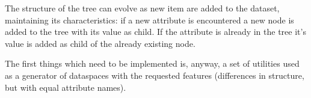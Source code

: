 \documentclass[12pt,a4paper]{article}
\begin{document}
The structure of the tree can evolve as new item are added to the dataset,
maintaining its characteristics: if a new attribute is encountered a new
node is added to the tree with its value as child. If the attribute is
already in the tree it's value is added as child of the already existing
node.

The first things which need to be implemented is, anyway, a set of
utilities used as a generator of dataspaces with the requested features
(differences in structure, but with equal attribute names). 
\end{document}

